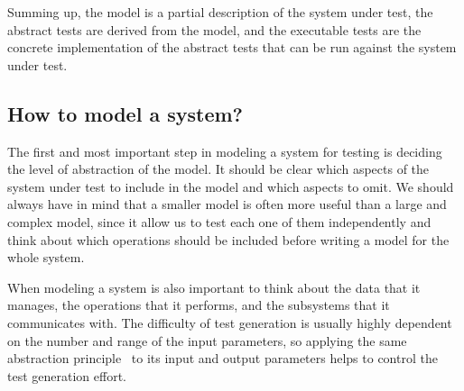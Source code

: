 Summing up, the model is a partial description of the system under test, the abstract tests are derived from the model, and the executable tests are the concrete implementation of the abstract tests that can be run against the system under test.


\subsection{How to model a system?}

The first and most important step in modeling a system for testing is deciding the level of abstraction of the model. It should be clear which aspects of the system under test to include in the model and which aspects to omit. We should always have in mind that a smaller model is often more useful than a large and complex model, since it allow us to test each one of them independently and think about which operations should be included before writing a model for the whole system. 

When modeling a system is also important to think about the data that it manages, the operations that it performs, and the subsystems that it communicates with. The difficulty of test generation is usually highly dependent on the number and range of the input parameters, so applying the same abstraction principle~\cite{Mosley2002} to its input and output parameters helps to control the test generation effort.


